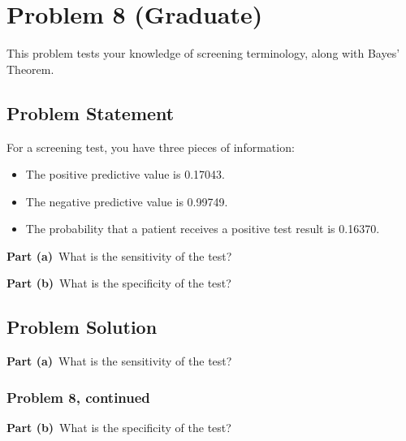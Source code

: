 \documentclass[12pt]{article}
\theoremstyle{definition}
\begin{document}
\newpage
\section*{Problem 8 (Graduate)}

This problem tests your knowledge of screening terminology, along with Bayes' Theorem.

\subsection*{Problem Statement}

For a screening test, you have three pieces of information:
\begin{itemize}
	\item The positive predictive value is 0.17043.
	\item The negative predictive value is 0.99749.
	\item The probability that a patient receives a positive test result is 0.16370.
\end{itemize}

\bigskip
\noindent
{\bf Part (a)}\ What is the sensitivity of the test?

\bigskip
\noindent
{\bf Part (b)}\ What is the specificity of the test?


\subsection*{Problem Solution}

\noindent
{\bf Part (a)}\ What is the sensitivity of the test?



\newpage
\subsubsection*{Problem 8, continued}

\vspace{2in}
\noindent
{\bf Part (b)}\ What is the specificity of the test?
\end{document}
